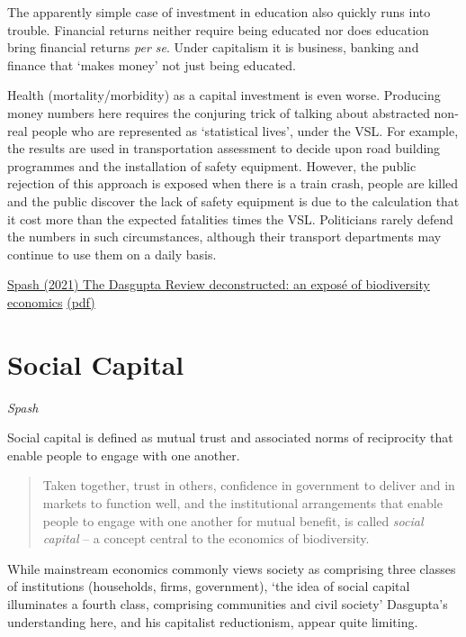 \documentclass[
]{book}
\begin{document}
The apparently simple case of investment in education also quickly runs into trouble. Financial
returns neither require being educated nor does education bring financial returns \emph{per se}.
Under capitalism it is business, banking and finance that `makes money' not just being educated.

Health (mortality/morbidity) as a capital investment is even worse. Producing money numbers
here requires the conjuring trick of talking about abstracted non-real people who are represented as
`statistical lives', under the VSL. For example, the results are used in transportation assessment to
decide upon road building programmes and the installation of safety equipment. However, the
public rejection of this approach is exposed when there is a train crash, people are killed and the
public discover the lack of safety equipment is due to the calculation that it cost more than the
expected fatalities times the VSL. Politicians rarely defend the numbers in such circumstances,
although their transport departments may continue to use them on a daily basis.

\href{https://www.tandf\%20online.com/doi/full/10.1080/14747731.2021.1929007}{Spash (2021) The Dasgupta Review deconstructed: an exposé of biodiversity economics}
\href{pdf/Spash_2021_Dasgupta_Deconstructed.pdf}{(pdf)}

\hypertarget{social-capital}{%
\section{Social Capital}\label{social-capital}}

\emph{Spash}

Social capital is defined as mutual trust and associated norms of reciprocity that enable people to
engage with one another.

\begin{quote}
Taken together, trust in others, confidence in government to deliver and in markets to function well,
and the institutional arrangements that enable people to engage with one another for mutual benefit, is
called \emph{social capital} -- a concept central to the economics of biodiversity.
\end{quote}

While mainstream economics commonly views society as comprising three classes of institutions
(households, firms, government), `the idea of social capital illuminates a fourth class, comprising
communities and civil society'
Dasgupta's understanding here, and his capitalist reductionism, appear quite limiting.
\end{document}
